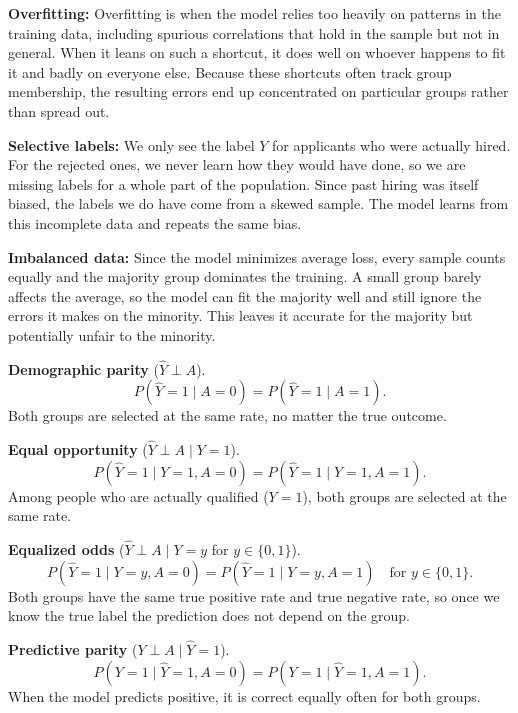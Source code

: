 \documentclass{cisXXX} %
\begin{document}
\HWsubproblem
\textbf{Overfitting:} Overfitting is when the model relies too heavily on patterns in the training data, including spurious correlations that hold in the sample but not in general. When it leans on such a shortcut, it does well on whoever happens to fit it and badly on everyone else. Because these shortcuts often track group membership, the resulting errors end up concentrated on particular groups rather than spread out.

\HWsubproblem
\textbf{Selective labels:} We only see the label $Y$ for applicants who were actually hired. For the rejected ones, we never learn how they would have done, so we are missing labels for a whole part of the population. Since past hiring was itself biased, the labels we do have come from a skewed sample. The model learns from this incomplete data and repeats the same bias.

\HWsubproblem
\textbf{Imbalanced data:} Since the model minimizes average loss, every sample counts equally and the majority group dominates the training. A small group barely affects the average, so the model can fit the majority well and still ignore the errors it makes on the minority. This leaves it accurate for the majority but potentially unfair to the minority.

\HWproblem
\HWsubproblem
\textbf{Demographic parity} ($\hat{Y} \perp A$).
$$P(\hat{Y} = 1 \mid A = 0) = P(\hat{Y} = 1 \mid A = 1).$$
Both groups are selected at the same rate, no matter the true outcome.

\HWsubproblem
\textbf{Equal opportunity} ($\hat{Y} \perp A \mid Y = 1$).
$$P(\hat{Y} = 1 \mid Y = 1, A = 0) = P(\hat{Y} = 1 \mid Y = 1, A = 1).$$
Among people who are actually qualified ($Y = 1$), both groups are selected at the same rate.

\HWsubproblem
\textbf{Equalized odds} ($\hat{Y} \perp A \mid Y = y$ for $y \in \{0,1\}$).
$$P(\hat{Y} = 1 \mid Y = y, A = 0) = P(\hat{Y} = 1 \mid Y = y, A = 1) \quad \text{for } y \in \{0, 1\}.$$
Both groups have the same true positive rate and true negative rate, so once we know the true label the prediction does not depend on the group.

\HWsubproblem
\textbf{Predictive parity} ($Y \perp A \mid \hat{Y} = 1$).
$$P(Y = 1 \mid \hat{Y} = 1, A = 0) = P(Y = 1 \mid \hat{Y} = 1, A = 1).$$
When the model predicts positive, it is correct equally often for both groups.
\end{document}
